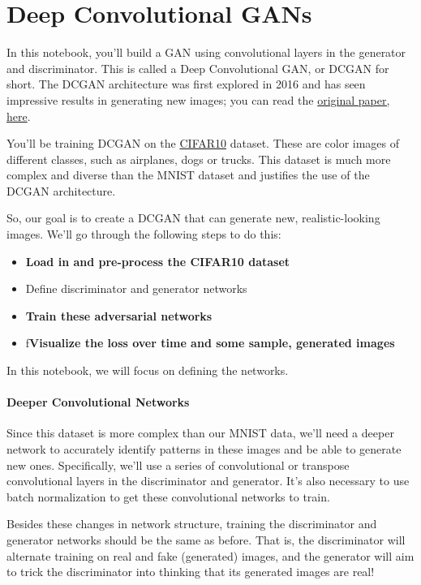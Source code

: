 \section{Deep Convolutional GANs}

In this notebook, you'll build a GAN using convolutional layers in the
generator and discriminator. This is called a Deep Convolutional GAN, or
DCGAN for short. The DCGAN architecture was first explored in 2016 and
has seen impressive results in generating new images; you can read the
\href{https://arxiv.org/pdf/1511.06434.pdf}{original paper, here}.

You'll be training DCGAN on the
\href{https://www.cs.toronto.edu/~kriz/cifar.html}{CIFAR10} dataset.
These are color images of different classes, such as airplanes, dogs or
trucks. This dataset is much more complex and diverse than the MNIST
dataset and justifies the use of the DCGAN architecture.

So, our goal is to create a DCGAN that can generate new,
realistic-looking images. We'll go through the following steps to do
this: 
\begin{itemize}
    \item \textbf{Load in and pre-process the CIFAR10 dataset}
    \item Define discriminator and generator networks
    \item \textbf{Train these adversarial networks}
    \item ƒ\textbf{Visualize the loss over time and some sample, generated images}
\end{itemize}

In this notebook, we will focus on defining the networks.

\paragraph{Deeper Convolutional Networks}

Since this dataset is more complex than our MNIST data, we'll need a
deeper network to accurately identify patterns in these images and be
able to generate new ones. Specifically, we'll use a series of
convolutional or transpose convolutional layers in the discriminator and
generator. It's also necessary to use batch normalization to get these
convolutional networks to train.

Besides these changes in network structure, training the discriminator
and generator networks should be the same as before. That is, the
discriminator will alternate training on real and fake (generated)
images, and the generator will aim to trick the discriminator into
thinking that its generated images are real!

